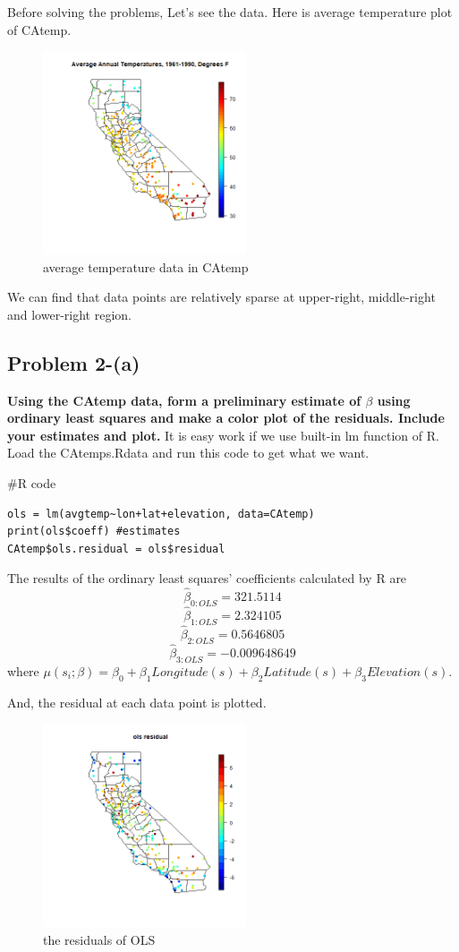 \documentclass{article}
\newenvironment{Rcode}%
{%
    \begin{mdframed}
    \#R code
    \begin{small}
}
{%
    \end{small}
    \end{mdframed}
}
\begin{document}
Before solving the problems, Let's see the data. Here is average temperature plot of CAtemp.
\begin{figure}[!h]
    \centering
    \includegraphics[height=6cm]{prob2_CAtemp_avgtemp.png}
    \caption{average temperature data in CAtemp}
\end{figure}
We can find that data points are relatively sparse at upper-right, middle-right and lower-right region.


\clearpage
\subsection{Problem 2-(a)}
\textbf{
Using the CAtemp data, form a preliminary estimate of $\beta$ using ordinary least squares 
and make a color plot of the residuals.
Include your estimates and plot.
}
It is easy work if we use built-in lm function of R.
Load the CAtemps.Rdata and run this code to get what we want.
\begin{Rcode}
    \begin{verbatim}
ols = lm(avgtemp~lon+lat+elevation, data=CAtemp)
print(ols$coeff) #estimates
CAtemp$ols.residual = ols$residual
    \end{verbatim}
\end{Rcode}
The results of the ordinary least squares' coefficients calculated by R are
\[\hat{\beta}_{0:OLS}=321.5114\]
\[\hat{\beta}_{1:OLS}=2.324105\]
\[\hat{\beta}_{2:OLS}=0.5646805\]
\[\hat{\beta}_{3:OLS}=-0.009648649\]
where \(\mu(s_i;\beta)=\beta_0+\beta_1 Longitude(s) + \beta_2 Latitude(s)+\beta_3 Elevation(s)\).

And, the residual at each data point is plotted.
\begin{figure}[!h]
    \centering
    \includegraphics[height=6cm]{prob2_CAtemp_ols_residual.png}
    \caption{the residuals of OLS}
\end{figure}
\end{document}
